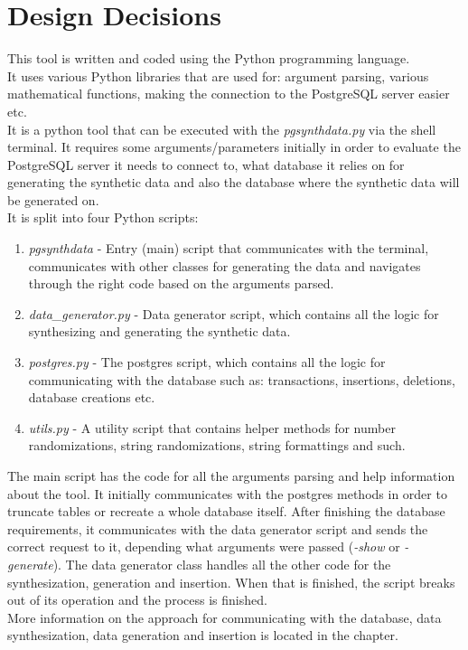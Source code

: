 \section{Design Decisions}
This tool is written and coded using the Python programming language.\\
It uses various Python libraries that are used for: argument parsing, various mathematical functions, making the connection to the PostgreSQL server easier etc.\\
It is a python tool that can be executed with the \textit{pgsynthdata.py} via the shell terminal. It requires some arguments/parameters initially in order to evaluate the PostgreSQL server it needs to connect to, what database it relies on for generating the synthetic data and also the database where the synthetic data will be generated on.\\
It is split into four Python scripts:
\begin{enumerate}
\item{\textit{pgsynthdata} - Entry (main) script that communicates with the terminal, communicates with other classes for generating the data and navigates through the right code based on the arguments parsed.}
\item{\textit{data\_generator.py} - Data generator script, which contains all the logic for synthesizing and generating the synthetic data.}
\item{\textit{postgres.py} - The postgres script, which contains all the  logic for communicating with the database such as: transactions, insertions, deletions, database creations etc.}
\item{\textit{utils.py} - A utility script that contains helper methods for number randomizations, string randomizations, string formattings and such.}
\end{enumerate}
The main script has the code for all the arguments parsing and help information about the tool. It initially communicates with the postgres methods in order to truncate tables or recreate a whole database itself. After finishing the database requirements, it communicates with the data generator script and sends the correct request to it, depending what arguments were passed (\textit{-show} or \textit{-generate}). The data generator class handles all the other code for the synthesization, generation and insertion. When that is finished, the script breaks out of its operation and the process is finished.\\
More information on the approach for communicating with the database, data synthesization, data generation and insertion is located in the  chapter.
